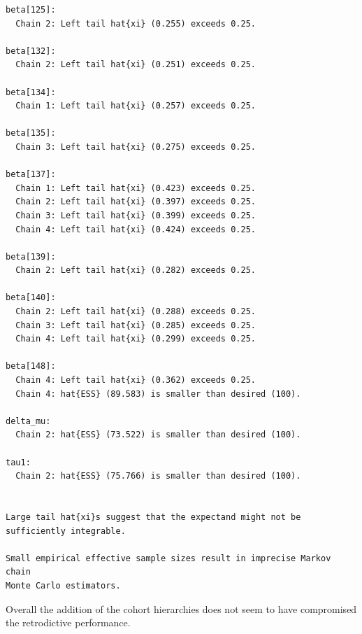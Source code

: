 \documentclass[
  letterpaper,
  DIV=11,
  numbers=noendperiod]{scrartcl}
\begin{document}
\begin{verbatim}
beta[125]:
  Chain 2: Left tail hat{xi} (0.255) exceeds 0.25.

beta[132]:
  Chain 2: Left tail hat{xi} (0.251) exceeds 0.25.

beta[134]:
  Chain 1: Left tail hat{xi} (0.257) exceeds 0.25.

beta[135]:
  Chain 3: Left tail hat{xi} (0.275) exceeds 0.25.

beta[137]:
  Chain 1: Left tail hat{xi} (0.423) exceeds 0.25.
  Chain 2: Left tail hat{xi} (0.397) exceeds 0.25.
  Chain 3: Left tail hat{xi} (0.399) exceeds 0.25.
  Chain 4: Left tail hat{xi} (0.424) exceeds 0.25.

beta[139]:
  Chain 2: Left tail hat{xi} (0.282) exceeds 0.25.

beta[140]:
  Chain 2: Left tail hat{xi} (0.288) exceeds 0.25.
  Chain 3: Left tail hat{xi} (0.285) exceeds 0.25.
  Chain 4: Left tail hat{xi} (0.299) exceeds 0.25.

beta[148]:
  Chain 4: Left tail hat{xi} (0.362) exceeds 0.25.
  Chain 4: hat{ESS} (89.583) is smaller than desired (100).

delta_mu:
  Chain 2: hat{ESS} (73.522) is smaller than desired (100).

tau1:
  Chain 2: hat{ESS} (75.766) is smaller than desired (100).


Large tail hat{xi}s suggest that the expectand might not be
sufficiently integrable.

Small empirical effective sample sizes result in imprecise Markov chain
Monte Carlo estimators.
\end{verbatim}

Overall the addition of the cohort hierarchies does not seem to have
compromised the retrodictive performance.
\end{document}
